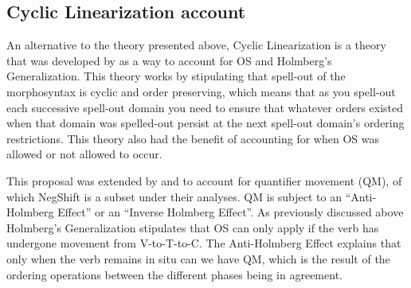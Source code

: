 \documentclass[12pt, letterpaper]{article}
\newcommand{\sub}[1]{\textsubscript{#1}}
\begin{document}



\subsection{Cyclic Linearization account} \label{sec:CL}

An alternative to the theory presented above, Cyclic Linearization is a theory that was developed by \cite{foxCyclicLinearizationSyntactic2005} as a way to account for OS and Holmberg's Generalization. This theory works by stipulating that spell-out of the morphosyntax is cyclic and order preserving, which means that as you spell-out each successive spell-out domain you need to ensure that whatever orders existed when that domain was spelled-out persist at the next spell-out domain's ordering restrictions. This theory also had the benefit of accounting for when OS was allowed or not allowed to occur. 

This proposal was extended by \citet{foxCyclicLinearizationSyntactic2005} and \citet{engelsMicrovariationObjectPositions2011,engelsScandinavianNegativeIndefinites2012} to account for quantifier movement (QM), of which NegShift is a subset under their analyses. QM is subject to an ``Anti-Holmberg Effect'' or an ``Inverse Holmberg Effect''. As previously discussed above Holmberg's Generalization stipulates that OS can only apply if the verb has undergone movement from V-to-T-to-C. The Anti-Holmberg Effect explains that only when the verb remains in situ can we have QM, which is the result of the ordering operations between the different phases being in agreement. 
\end{document}
